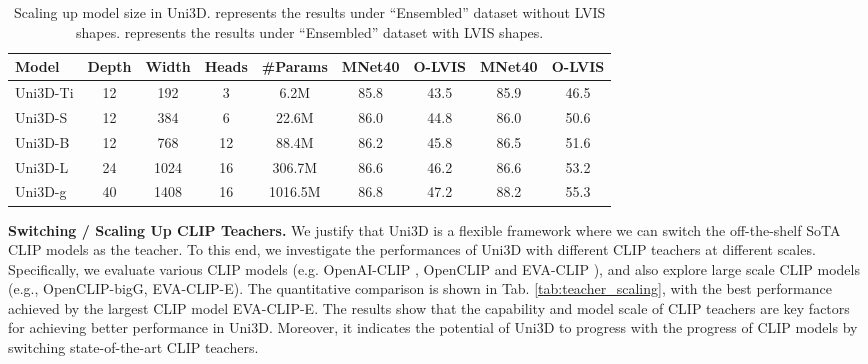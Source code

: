\documentclass{article} \usepackage{iclr2024_conference,times}
\def\Ours{Uni3D\xspace}
\begin{document}
\begin{table}[tb]
    \centering
        \caption{Scaling up model size in Uni3D.  represents the results under ``Ensembled'' dataset without LVIS shapes.  represents the results under ``Ensembled'' dataset with LVIS shapes.
}
\vspace{0.2cm}

    \begin{tabular}{l|ccc|c|cc|cc}
        \toprule
        Model & Depth & Width & Heads & \#Params & MNet40 & O-LVIS & MNet40 & O-LVIS \\ \midrule
        Uni3D-Ti & 12  & 192 & 3 & 6.2M & 85.8 & 43.5 & 85.9 & 46.5 \\
        Uni3D-S & 12  & 384 & 6 & 22.6M & 86.0 & 44.8 & 86.0 & 50.6 \\
        Uni3D-B & 12 & 768 & 12 & 88.4M & 86.2 & 45.8 & 86.5 & 51.6\\
        Uni3D-L & 24 & 1024 & 16 & 306.7M & 86.6 & 46.2 & 86.6 & 53.2 \\             Uni3D-g & 40 & 1408 & 16 & 1016.5M & 86.8 & 47.2 & 88.2 & 55.3 \\
        \bottomrule
    \end{tabular}

    \label{tab:model_scaling}
    \vspace{-0.6cm}
\end{table}

\textbf{Switching / Scaling Up CLIP Teachers.}
We justify that \Ours is a flexible framework where we can switch the off-the-shelf SoTA CLIP models as the teacher. To this end, we investigate the performances of \Ours with different CLIP teachers at different scales. Specifically, we evaluate various CLIP models (e.g. OpenAI-CLIP \citep{radford2021learning}, OpenCLIP \citep{cherti2023reproducible} and EVA-CLIP \citep{sun2023eva}), and also explore large scale CLIP models (e.g., OpenCLIP-bigG, EVA-CLIP-E). The quantitative comparison is shown in Tab. \ref{tab:teacher_scaling}, with the best performance achieved by the largest CLIP model EVA-CLIP-E. The results show that the capability and model scale of CLIP teachers are key factors for achieving better performance in \Ours. Moreover, it indicates the potential of \Ours to progress with the progress of CLIP models by switching state-of-the-art CLIP teachers. 
\end{document}
